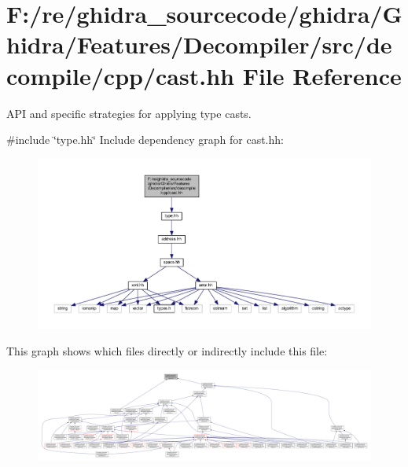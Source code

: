 \hypertarget{cast_8hh}{}\section{F\+:/re/ghidra\+\_\+sourcecode/ghidra/\+Ghidra/\+Features/\+Decompiler/src/decompile/cpp/cast.hh File Reference}
\label{cast_8hh}


A\+PI and specific strategies for applying type casts.  


{\ttfamily \#include \char`\"{}type.\+hh\char`\"{}}\newline
Include dependency graph for cast.\+hh\+:
\nopagebreak
\begin{figure}[H]
\begin{center}
\leavevmode
\includegraphics[width=350pt]{cast_8hh__incl}
\end{center}
\end{figure}
This graph shows which files directly or indirectly include this file\+:
\nopagebreak
\begin{figure}[H]
\begin{center}
\leavevmode
\includegraphics[width=350pt]{cast_8hh__dep__incl}
\end{center}
\end{figure}
